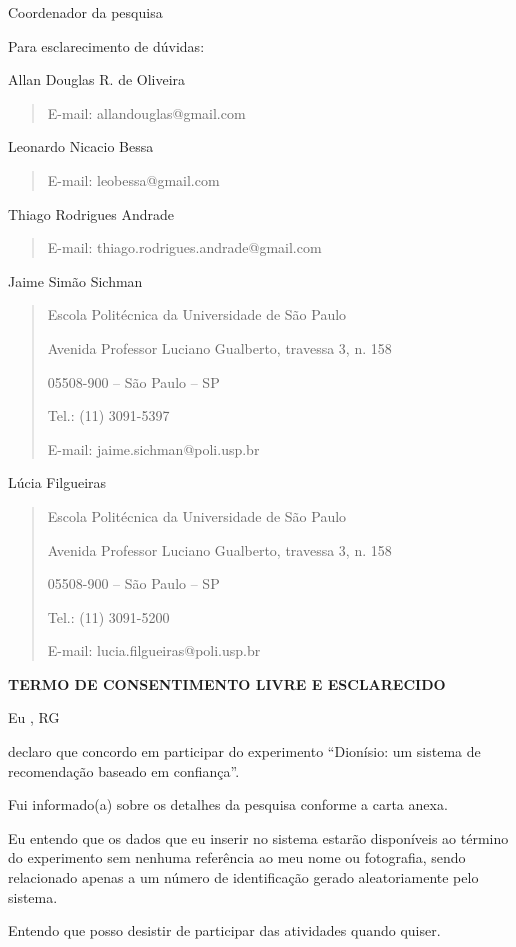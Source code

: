 Coordenador da pesquisa

\vspace{0.2in}

Para esclarecimento de dúvidas:

Allan Douglas R. de Oliveira
\begin{quote}
	E-mail: allandouglas@gmail.com
\end{quote}
Leonardo Nicacio Bessa
\begin{quote}
	E-mail: leobessa@gmail.com
\end{quote}	
Thiago Rodrigues Andrade
\begin{quote}
	E-mail: thiago.rodrigues.andrade@gmail.com
\end{quote}
Jaime Simão Sichman
\begin{quote}
Escola Politécnica da Universidade de São Paulo

Avenida Professor Luciano Gualberto, travessa 3, n. 158

05508-900 – São Paulo – SP

Tel.: (11) 3091-5397

E-mail: jaime.sichman@poli.usp.br
\end{quote}
Lúcia Filgueiras
\begin{quote}
Escola Politécnica da Universidade de São Paulo

Avenida Professor Luciano Gualberto, travessa 3, n. 158

05508-900 – São Paulo – SP

Tel.: (11) 3091-5200

E-mail: lucia.filgueiras@poli.usp.br
\end{quote}
\vspace{3.5in}
\centerline{\textbf{TERMO DE CONSENTIMENTO LIVRE E ESCLARECIDO}}

Eu \hspace{9.5cm}, RG

declaro que concordo em participar do experimento ``Dionísio: um sistema de recomendação baseado em confiança''.

Fui informado(a) sobre os detalhes da pesquisa conforme a carta anexa.

Eu entendo que os dados que eu inserir no sistema estarão disponíveis ao término do experimento sem nenhuma referência ao meu nome ou fotografia, sendo relacionado  apenas a um número de identificação gerado aleatoriamente pelo sistema.

Entendo que posso desistir de participar das atividades quando quiser. 

